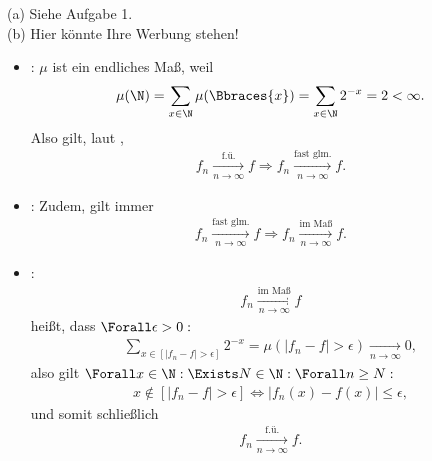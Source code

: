 \begin{solution}

(a) Siehe Aufgabe 1. \\

(b) Hier könnte Ihre Werbung stehen!

\begin{itemize}

  \item {}: $\mu$ ist ein endliches Maß, weil
  \begin{align*}
    \mu(\N)
    =
    \sum_{x \in \N} \mu(\Bbraces{x})
    =
    \sum_{x \in \N} 2^{-x}
    =
    2 < \infty.
  \end{align*}
  Also gilt, laut ,
  \begin{align*}
    f_n \xrightarrow[n \to \infty]{\text{f.ü.}} f
    \Rightarrow
    f_n \xrightarrow[n \to \infty]{\text{fast glm.}} f.
  \end{align*}

  \item {}: Zudem, gilt immer
  \begin{align*}
    f_n \xrightarrow[n \to \infty]{\text{fast glm.}} f
    \Rightarrow
    f_n \xrightarrow[n \to \infty]{\text{im Maß}} f.
  \end{align*}

  \item {}:
  \begin{align*}
    f_n \xrightarrow[n \to \infty]{\text{im Maß}} f
  \end{align*}
  heißt, dass $\Forall \epsilon > 0:$
  \begin{align*}
    \sum_{x \in [|f_n - f| > \epsilon]} 2^{-x}
    =
    \mu(|f_n - f| > \epsilon)
    \xrightarrow[n \to \infty]{} 0,
  \end{align*}
  also gilt $\Forall x \in \N: \Exists N \in \N: \Forall n \geq N:$
  \begin{align*}
    x \notin [|f_n - f| > \epsilon]
    \Leftrightarrow
    |f_n(x) - f(x)| \leq \epsilon,
  \end{align*}
  und somit schließlich
  \begin{align*}
    f_n \xrightarrow[n \to \infty]{\text{f.ü.}} f.
  \end{align*}

\end{itemize}

\end{solution}

